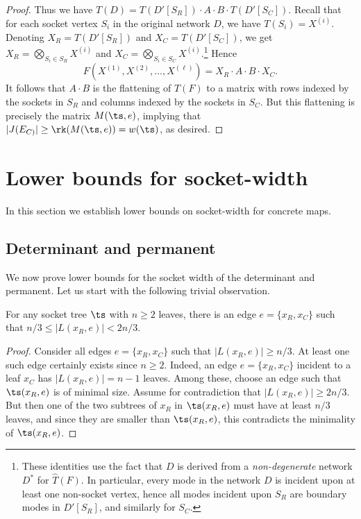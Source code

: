\begin{proof}
  Thus we have $T(D) = T(D'[S_R]) \cdot A \cdot
  B \cdot T(D'[S_C])$.  Recall that for each
  socket vertex $S_i$ in the original network $D$, we have $T(S_i) = X^{(i)}$.  Denoting $X_R = T(D'[S_R])$ and $X_C = T(D'[S_C])$, we get $X_R = \bigotimes_{S_i \in S_R} X^{(i)}$ and $X_C = \bigotimes_{S_i \in S_C} X^{(i)}$.\footnote{These identities use the fact that $D$ is derived from a \emph{non-degenerate} network $D^*$ for $\hat{T}(F)$.  In particular, every mode in the network $D$ is incident upon at least one non-socket vertex, hence all modes incident upon $S_R$ are boundary modes in $D'[S_R]$, and similarly for $S_C$.}
    Hence
  \[
  F(X^{(1)}, X^{(2)}, \ldots, X^{(\ell)}) = X_R \cdot A \cdot B \cdot X_C.
  \]
  It follows that $A \cdot B$ is the flattening of $T(F)$
  to a matrix with rows indexed by the sockets in $S_R$ and columns
  indexed by the sockets in $S_C$.  But this flattening is precisely
  the matrix $M(\ts, e)$, implying that $|J(E_{C)}| \ge \rk(M(\ts, e)) =
  w(\ts)$, as desired.
\end{proof}


\section{Lower bounds for socket-width}
\label{sec:socket-width lower bound}

In this section we establish lower bounds on socket-width for concrete
maps.

\subsection{Determinant and permanent}
\label{sec:det and per socket width lower bounds}
\label{sec:permanent barrier}

We now prove lower bounds for the socket width of the determinant and
permanent.
Let us start with the following trivial observation.

\begin{claim}
  \label{claim:balanced edge}
  For any socket tree $\ts$ with $n \ge 2$ leaves, there is an edge $e = \{x_R, x_C\}$
  such that $n/3 \le |L(x_R, e)| < 2n/3$.
\end{claim}

\begin{proof}
  Consider all edges $e = \{x_R, x_C\}$ such that $|L(x_R, e)| \ge n/3$.  At
  least one such edge certainly exists since $n \ge 2$. Indeed, an edge
  $e = \{x_R, x_C\}$ incident to a leaf $x_C$ has $|L(x_R, e)| = n-1$
  leaves.  Among these, choose an edge such that $\ts(x_R, e)$ is of minimal size.
%
  Assume for contradiction that $|L(x_R, e)| \ge 2n/3$.  But then one of
  the two subtrees of $x_R$ in $\ts(x_R, e)$ must have at least $n/3$
  leaves, and since they are smaller than $\ts(x_R, e)$, this contradicts
  the minimality of $\ts(x_R, e)$.
\end{proof}

